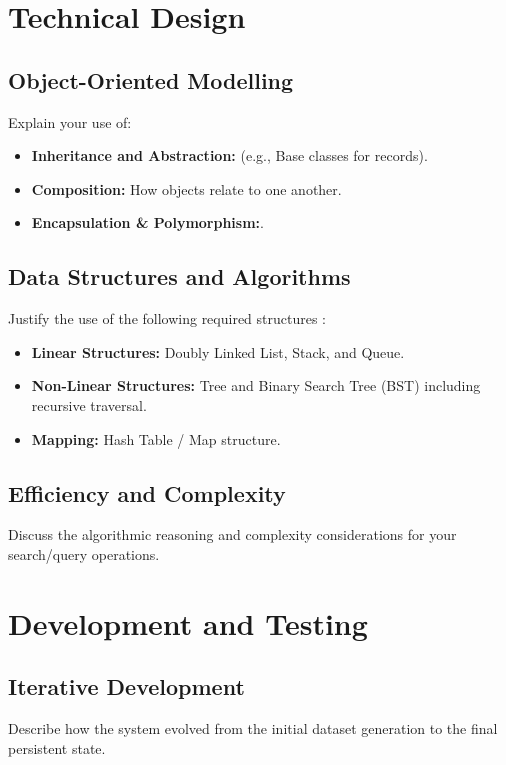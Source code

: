 \documentclass[11pt,a4paper]{article}
\begin{document}
\section{Technical Design}
\label{sec:technical_design}

\subsection{Object-Oriented Modelling}
Explain your use of:
\begin{itemize}
    \item \textbf{Inheritance and Abstraction:} (e.g., Base classes for records).
    \item \textbf{Composition:} How objects relate to one another.
    \item \textbf{Encapsulation \& Polymorphism:}.
\end{itemize}

\subsection{Data Structures and Algorithms}
Justify the use of the following required structures :
\begin{itemize}
    \item \textbf{Linear Structures:} Doubly Linked List, Stack, and Queue.
    \item \textbf{Non-Linear Structures:} Tree and Binary Search Tree (BST) including recursive traversal.
    \item \textbf{Mapping:} Hash Table / Map structure.
\end{itemize}

\subsection{Efficiency and Complexity}
Discuss the algorithmic reasoning and complexity considerations for your search/query operations.

\section{Development and Testing}
\label{sec:dev_testing}

\subsection{Iterative Development}
Describe how the system evolved from the initial dataset generation to the final persistent state.
\end{document}
